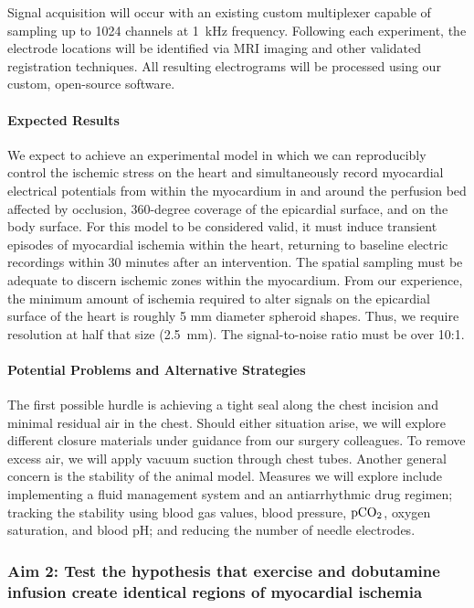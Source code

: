 Signal acquisition will occur with an existing custom multiplexer capable
of sampling up to 1024 channels at 1~kHz frequency.   Following each experiment, the electrode locations will be
identified via MRI imaging and other validated registration
techniques.\cite{BLZ:Zen2018a} All resulting electrograms will be processed
using our custom, open-source software.\cite{RSM:Rod2018}


\paragraph{Expected Results} We expect to achieve an experimental model in
which we can reproducibly control the ischemic stress on the heart and
simultaneously record myocardial electrical potentials from within the
myocardium in and around the perfusion bed affected by
occlusion, 360-degree coverage of the epicardial surface, and on the body surface.  For this
model to be considered valid, it must induce transient episodes of
myocardial ischemia within the heart, returning to baseline electric
recordings within 30 minutes after an intervention. The spatial sampling
must be adequate to discern ischemic zones within the myocardium. From our
experience, the minimum amount of ischemia required to alter signals on the
epicardial surface of the heart is roughly 5 mm diameter spheroid
shapes. Thus, we require resolution at half that size (2.5~mm).  The signal-to-noise ratio must be over 10:1.


\paragraph{Potential Problems and Alternative Strategies} The first
possible hurdle is achieving a tight seal along the chest incision and
minimal residual air in the chest.  Should either situation arise, we will
explore different closure materials under guidance from our surgery
colleagues. To remove excess air, we will apply vacuum suction through
chest tubes. Another general concern is the stability of the animal
model. Measures we will explore include implementing a fluid management
system and an antiarrhythmic drug regimen; tracking the stability using
blood gas values, blood pressure, ${\rm pCO_2}$, oxygen saturation, and
blood pH; and reducing the number of needle electrodes.


\subsubsection{Aim 2: Test the hypothesis that exercise and dobutamine infusion create identical regions of myocardial ischemia}

